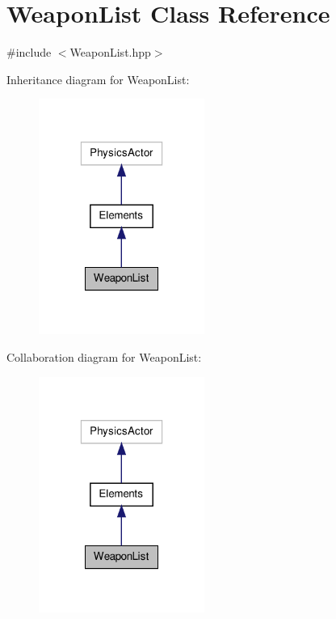 \hypertarget{class_weapon_list}{\section{Weapon\-List Class Reference}
\label{class_weapon_list}
}


{\ttfamily \#include $<$Weapon\-List.\-hpp$>$}



Inheritance diagram for Weapon\-List\-:\nopagebreak
\begin{figure}[H]
\begin{center}
\leavevmode
\includegraphics[width=154pt]{class_weapon_list__inherit__graph}
\end{center}
\end{figure}


Collaboration diagram for Weapon\-List\-:\nopagebreak
\begin{figure}[H]
\begin{center}
\leavevmode
\includegraphics[width=154pt]{class_weapon_list__coll__graph}
\end{center}
\end{figure}
